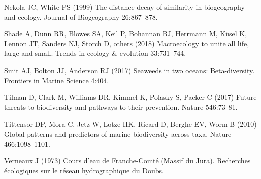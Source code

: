\documentclass[
  10pt,
]{book}
\newlength{\cslhangindent}
\newenvironment{CSLReferences}[2] %
 {\begin{list}{}{%
  \setlength{\itemindent}{0pt}
  \setlength{\leftmargin}{0pt}
  \setlength{\parsep}{0pt}
  \ifodd #1
   \setlength{\leftmargin}{\cslhangindent}
   \setlength{\itemindent}{-1\cslhangindent}
  \fi
  \setlength{\itemsep}{#2\baselineskip}}}
 {\end{list}}
\begin{document}
\begin{CSLReferences}{1}{1}
Nekola JC, White PS (1999) The distance decay of similarity in
biogeography and ecology. {Journal of Biogeography} 26:867--878.

Shade A, Dunn RR, Blowes SA, Keil P, Bohannan BJ, Herrmann M, Küsel K,
Lennon JT, Sanders NJ, Storch D, others (2018) Macroecology to unite all
life, large and small. Trends in ecology \& evolution 33:731--744.

Smit AJ, Bolton JJ, Anderson RJ (2017) Seaweeds in two oceans:
Beta-diversity. {Frontiers in Marine Science} 4:404.

Tilman D, Clark M, Williams DR, Kimmel K, Polasky S, Packer C (2017)
Future threats to biodiversity and pathways to their prevention. Nature
546:73--81.

Tittensor DP, Mora C, Jetz W, Lotze HK, Ricard D, Berghe EV, Worm B
(2010) Global patterns and predictors of marine biodiversity across
taxa. Nature 466:1098--1101.

Verneaux J (1973) Cours d'eau de {F}ranche-{C}omt{é} ({M}assif du
{J}ura). Recherches {é}cologiques sur le r{é}seau hydrographique du
{D}oubs.

\end{CSLReferences}


\backmatter
\end{document}
